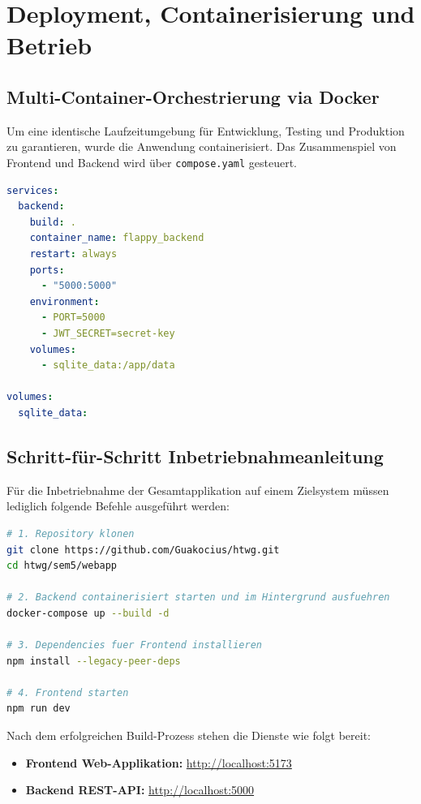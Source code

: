 \documentclass[12pt,a4paper]{article}
\begin{document}
\section{Deployment, Containerisierung und Betrieb}

\subsection{Multi-Container-Orchestrierung via Docker}
Um eine identische Laufzeitumgebung für Entwicklung, Testing und Produktion zu garantieren, wurde die Anwendung containerisiert. Das Zusammenspiel von Frontend und Backend wird über \texttt{compose.yaml} gesteuert.

\begin{lstlisting}[language=yaml, caption={Docker-Compose Konfiguration (\texttt{compose.yaml})}]
services:
  backend:
    build: .
    container_name: flappy_backend
    restart: always
    ports:
      - "5000:5000"
    environment:
      - PORT=5000
      - JWT_SECRET=secret-key
    volumes:
      - sqlite_data:/app/data

volumes:
  sqlite_data:
\end{lstlisting}

\subsection{Schritt-für-Schritt Inbetriebnahmeanleitung}
Für die Inbetriebnahme der Gesamtapplikation auf einem Zielsystem müssen lediglich folgende Befehle ausgeführt werden:

\begin{lstlisting}[language=bash, caption={Inbetriebnahme-Befehle}]
# 1. Repository klonen
git clone https://github.com/Guakocius/htwg.git
cd htwg/sem5/webapp

# 2. Backend containerisiert starten und im Hintergrund ausfuehren
docker-compose up --build -d

# 3. Dependencies fuer Frontend installieren
npm install --legacy-peer-deps

# 4. Frontend starten
npm run dev
\end{lstlisting}

Nach dem erfolgreichen Build-Prozess stehen die Dienste wie folgt bereit:
\begin{itemize}
  \item \textbf{Frontend Web-Applikation:} \url{http://localhost:5173}
  \item \textbf{Backend REST-API:} \url{http://localhost:5000}
\end{itemize}
\end{document}
